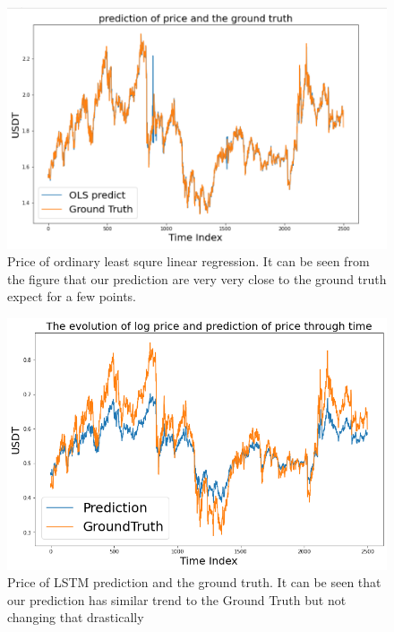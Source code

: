 \documentclass[twoside]{report}
\begin{document}
\begin{spacing}{1}
\begin{figure}[!htbp]
    \centering
    \includegraphics[scale = 0.65]{Images/OLS price prediction.png}
    \caption{Price of ordinary least squre linear regression. It can be seen from the figure that our prediction are very very close to the ground truth expect for a few points.}
    \label{fig:OLS price}
\end{figure}

\begin{figure}[!htbp]
    \centering
    \includegraphics[scale = 0.5]{Images/LSTM price.png}
    \caption{Price of LSTM prediction and the ground truth. It can be seen that our prediction has similar trend to the Ground Truth but not changing that drastically}
    \label{fig:LSTM price}
\end{figure}



\end{spacing}
\end{document}
